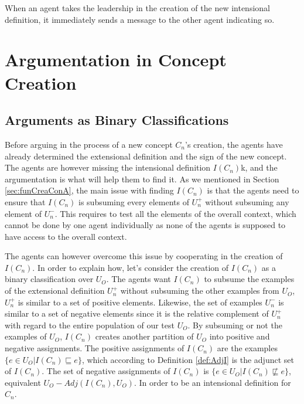 When an agent takes the leadership in the creation of the new intensional definition, it immediately sends a message to the other agent indicating so.

\section{Argumentation in Concept Creation}
\label{sec:Knowledge}

\subsection{Arguments as Binary Classifications}

Before arguing in the process of a new concept $C_{n}$'s creation, the agents have already determined the extensional definition and the sign of the new concept. The agents are however missing the intensional definition $I(C_{n})$k, and the argumentation is what will help them to find it. As we mentioned in Section \ref{sec:funCreaConA}, the main issue with finding $I(C_{n})$ is that the agents need to ensure that $I(C_{n})$ is subsuming every elements of $U^{+}_{n}$ without subsuming any element of $U^{-}_{n}$. This requires to test all the elements of the overall context, which cannot be done by one agent individually as none of the agents is supposed to have access to the overall context.

The agents can however overcome this issue by cooperating in the creation of $I(C_{n})$. In order to explain how, let's consider the creation of $I(C_{n})$ as a binary classification over $U_{O}$. The agents want $I(C_{n})$ to subsume the examples of the extensional definition $U^{+}_{n}$ without subsuming the other examples from $U_{O}$, $U^{+}_{n}$ is similar to a set of positive elements. Likewise, the set of examples $U^{-}_{n}$ is similar to a set of negative elements since it is the relative complement of $U^{+}_{n}$ with regard to the entire population of our test $U_{O}$. By subsuming or not the examples of $U_{O}$, $I(C_{n})$ creates another partition of $U_{O}$ into positive and negative assignments. The positive assignments of $I(C_{n})$ are the examples $\{e \in U_{O} | I(C_{n}) \sqsubseteq e \}$, which according to Definition \ref{def:AdjI} is the adjunct set of $I(C_{n})$. The set of negative assignments of $I(C_{n})$ is $\{e \in U_{O} | I(C_{n}) \not \sqsubseteq e \}$, equivalent $U_{O} - Adj(I(C_{n}),U_{O})$. In order to be an intensional definition for $C_{n}$.

